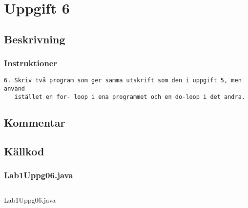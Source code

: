 \section{Uppgift 6}\label{uppgift-6}

\subsection{Beskrivning}
\subsubsection*{Instruktioner}
\begin{verbatim}
6. Skriv två program som ger samma utskrift som den i uppgift 5, men använd
   istället en for- loop i ena programmet och en do-loop i det andra.
\end{verbatim}

\subsection{Kommentar}

\subsection{Källkod}\label{uppgift-6_src}
\subsubsection*{Lab1Uppg06.java}
\begin{listing}[H]
    \inputminted[]{java}{src/Lab1Uppg06.java}
    \caption{Lab1Uppg06.java}
    \label{Uppg6src}
\end{listing}
